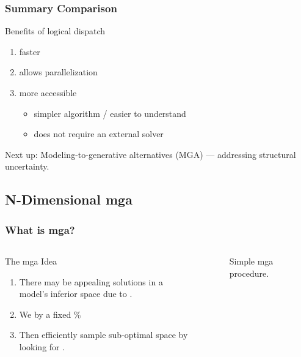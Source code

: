 \begin{frame}
    \frametitle{Summary Comparison}

    Benefits of logical dispatch

    \begin{enumerate}
        \item faster
        \item allows parallelization
        \item more accessible
        \begin{itemize}
            \item simpler algorithm / easier to understand
            \item does not require an external solver
        \end{itemize}
    \end{enumerate}

    \pause

    \begin{block}{Next up:}
         Modeling-to-generative alternatives (MGA) --- addressing structural uncertainty.
    \end{block}

\end{frame}

\subsection{N-Dimensional \gls{mga}}

\begin{frame}
    \frametitle{What is \gls{mga}?}

    \begin{columns}
        \column[t]{3.5cm}
        \begin{block}{The \gls{mga} Idea}
            \begin{enumerate}[<+->]
                \item There may be appealing solutions in a model's inferior
                space due to .
                \item We  by a fixed \% 
                \item Then efficiently sample sub-optimal space by looking for
                 \cite{decarolis_using_2011}.
            \end{enumerate}    
        \end{block}
    \column[t]{7cm}
        \begin{figure}
            \centering
            \resizebox{\columnwidth}{!}{}
            \caption{Simple \gls{mga} procedure.}
        \end{figure}
    \end{columns}
\end{frame}

